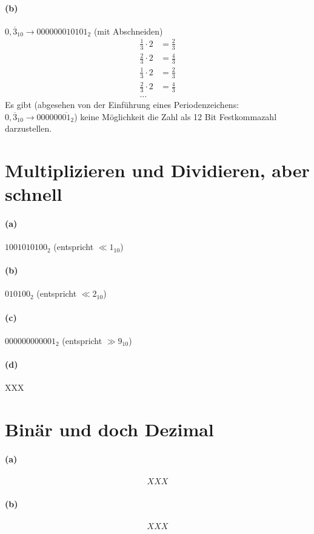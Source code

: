 \documentclass[a4paper]{article}
\begin{document}
\paragraph{(b)}
$0,\overline{3}_{10}\rightarrow 000000010101_{2}$ (mit Abschneiden)
\begin{align*}
	\frac{1}{3}\cdot 2 &= \frac{2}{3} \\
	\frac{2}{3}\cdot 2 &= \frac{4}{3} \\
	\frac{1}{3}\cdot 2 &= \frac{2}{3} \\
	\frac{2}{3}\cdot 2 &= \frac{4}{3} \\
	\text{\ldots}
\end{align*}
Es gibt (abgesehen von der Einführung eines Periodenzeichens: $0,\overline{3}_{10}\rightarrow 000000\overline{01}_{2}$) keine Möglichkeit die Zahl als 12 Bit Festkommazahl darzustellen.



\section{Multiplizieren und Dividieren, aber schnell}
\paragraph{(a)}
$1001010100_{2}$ (entspricht $\ll 1_{10}$)
\paragraph{(b)}
$010100_{2}$ (entspricht $\ll 2_{10}$)
\paragraph{(c)}
$000000000001_{2}$ (entspricht $\gg 9_{10}$)
\paragraph{(d)}
XXX


\section{Binär und doch Dezimal}
\paragraph{(a)}
\begin{align*}
XXX
\end{align*}
\paragraph{(b)}
\begin{align*}
XXX
\end{align*}
\end{document}
